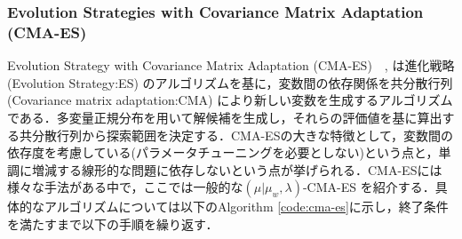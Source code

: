 \documentclass[a4j,11pt]{jarticle}
\begin{document}
\subsubsection{Evolution Strategies with Covariance Matrix Adaptation (CMA-ES)}
\label{sss:cma-es}

Evolution Strategy with Covariance Matrix Adaptation (CMA-ES)　\cite{mu-CMA-ES}, \cite{CMA-ES} は進化戦略 (Evolution Strategy:ES) \cite{ES} のアルゴリズムを基に，変数間の依存関係を共分散行列 (Covariance matrix adaptation:CMA) \cite{CMA} により新しい変数を生成するアルゴリズムである．多変量正規分布を用いて解候補を生成し，それらの評価値を基に算出する共分散行列から探索範囲を決定する．CMA-ESの大きな特徴として，変数間の依存度を考慮している(パラメータチューニングを必要としない)という点と，単調に増減する線形的な問題に依存しないという点が挙げられる．CMA-ESには様々な手法がある中で，ここでは一般的な$(\mu|\mu_w,\lambda)$-CMA-ES \cite{CMA-ES} を紹介する．具体的なアルゴリズムについては以下のAlgorithm \ref{code:cma-es}に示し，終了条件を満たすまで以下の手順を繰り返す．
\end{document}
